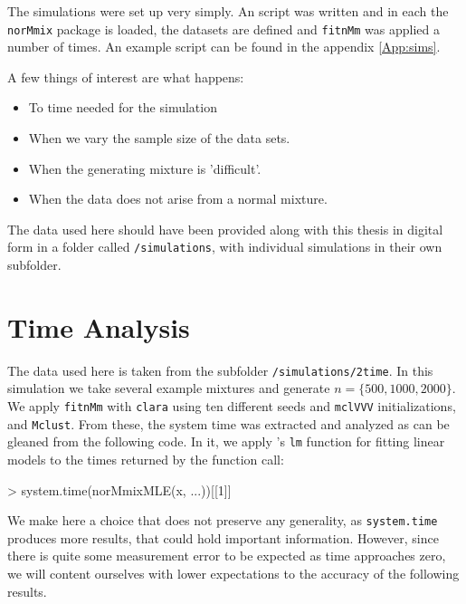 The simulations were set up very simply. An \Rp script was written and in each
the {\tt norMmix} package is loaded, the datasets are defined and {\tt fitnMm}
was applied a number of times. An example script can be found in the appendix
\ref{App:sims}.

A few things of interest are what happens:

\begin{itemize}
    \item To time needed for the simulation
    \item When we vary the sample size of the data sets.
    \item When the generating mixture is 'difficult'.
    \item When the data does not arise from a normal mixture.
\end{itemize}

The data used here should have been provided along with this thesis in digital 
form in a folder called {\tt /simulations}, with individual simulations in 
their own subfolder.


\section{Time Analysis}
\label{sec:time}

The data used here is taken from the subfolder {\tt /simulations/2time}.
In this simulation we take several example mixtures and generate $n = \{500, 1000, 2000\}$.
We apply {\tt fitnMm} with {\tt clara} using ten different seeds and {\tt mclVVV}
initializations, and {\tt Mclust}.
From these, the system time was extracted and analyzed as can be gleaned from
the following code. In it, we apply \Rp's {\tt lm} function for fitting linear 
models to the times returned by the function call:

\begin{Schunk}
\begin{Sinput}
>     system.time(norMmixMLE(x, ...))[[1]]
\end{Sinput}
\end{Schunk}

We make here a choice that does not preserve any generality, as 
{\tt system.time} produces more results, that could hold important information.
However, since there is quite some measurement error to be expected as time 
approaches zero, we will content ourselves with lower expectations to the 
accuracy of the following results.


